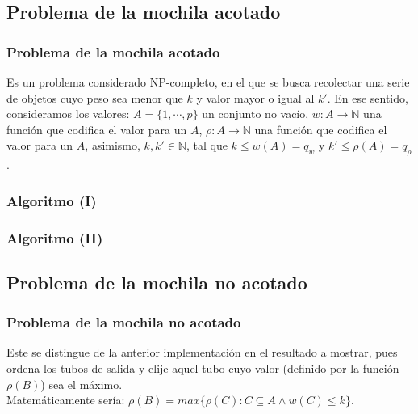 \documentclass[12pt]{beamer}
\begin{document}
 \begin{frame}
    \section{Problema de la mochila acotado}
    \frametitle{Problema de la mochila acotado}
    Es un problema considerado NP-completo, en el que se busca recolectar una serie de objetos cuyo peso sea menor que $k$ y valor mayor o igual al $k'$. En ese sentido, consideramos los valores: $A=\{1,\cdots,p\}$ un conjunto no vacío, $w:A\rightarrow\mathbb{N}$ una función que codifica el valor para un $A$, $\rho:A\rightarrow\mathbb{N}$ una función que codifica el valor para un $A$, asimismo, $k,k'\in\mathbb{N}$, tal que $k\leq w(A)=q_w$ y $k'\leq \rho(A)=q_\rho$.
 \end{frame}
 \begin{frame}
     \frametitle{Algoritmo (I)}
    \begin{algorithmic}[1]
        \State{$\cdots$}
        \EndProcedure
    \end{algorithmic}
 \end{frame}
 \begin{frame}
     \frametitle{Algoritmo (II)}
    \begin{algorithmic}[1]
        \State{$\cdots$}
        \EndFor
        \EndProcedure
    \end{algorithmic}
 \end{frame}
 \begin{frame}
     \section{Problema de la mochila no acotado}
     \frametitle{Problema de la mochila no acotado}
     Este se distingue de la anterior implementación en el resultado a mostrar, pues ordena los tubos de salida y elije aquel tubo cuyo valor (definido por la función $\rho(B)$) sea el máximo. \\
     Matemáticamente sería: $\rho(B)=max\{\rho(C): C\subseteq A \land w(C)\leq k\}$.
 \end{frame}
\end{document}
